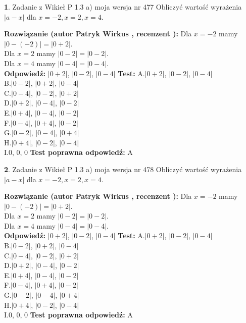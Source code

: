 \documentclass[12pt, a4paper]{article}
\theoremstyle{definition} %
\newtheorem{zad}{}
\newcommand{\zadStart}[1]{\begin{zad}#1\newline}
\newcommand{\zadStop}{\end{zad}}
\newcommand{\rozwStart}[2]{\noindent \textbf{Rozwiązanie (autor #1 , recenzent #2): }\newline}
\newcommand{\rozwStop}{\newline}
\newcommand{\odpStart}{\noindent \textbf{Odpowiedź:}\newline}
\newcommand{\odpStop}{\newline}
\newcommand{\testStart}{\noindent \textbf{Test:}\newline}
\newcommand{\testStop}{\newline}
\newcommand{\kluczStart}{\noindent \textbf{Test poprawna odpowiedź:}\newline}
\newcommand{\kluczStop}{\newline}
\begin{document}
\zadStart{Zadanie z Wikieł P 1.3 a) moja wersja nr 477}
Obliczyć wartość wyrażenia $|a - x|$ dla $x=-2,x=2,x=4$.
\zadStop
\rozwStart{Patryk Wirkus}{}
Dla $x = -2$ mamy $|0 - (-2)| = |0 + 2|$.\\
Dla $x = 2$ mamy $|0 - 2| = |0 - 2|$.\\
Dla $x = 4$ mamy $|0 - 4| = |0 - 4|$.\\
\rozwStop
\odpStart
$|0 + 2|$, $|0 - 2|$, $|0 - 4|$
\odpStop
\testStart
A.$|0 + 2|$, $|0 - 2|$, $|0 - 4|$\\
B.$|0 - 2|$, $|0 + 2|$, $|0 - 4|$\\
C.$|0 - 4|$, $|0 - 2|$, $|0 + 2|$\\
D.$|0 + 2|$, $|0 - 4|$, $|0 - 2|$\\
E.$|0 + 4|$, $|0 - 4|$, $|0 - 2|$\\
F.$|0 - 4|$, $|0 + 4|$, $|0 - 2|$\\
G.$|0 - 2|$, $|0 - 4|$, $|0 + 4|$\\
H.$|0 + 4|$, $|0 - 2|$, $|0 - 4|$\\
I.$0$, $0$, $0$
\testStop
\kluczStart
A
\kluczStop



\zadStart{Zadanie z Wikieł P 1.3 a) moja wersja nr 478}
Obliczyć wartość wyrażenia $|a - x|$ dla $x=-2,x=2,x=4$.
\zadStop
\rozwStart{Patryk Wirkus}{}
Dla $x = -2$ mamy $|0 - (-2)| = |0 + 2|$.\\
Dla $x = 2$ mamy $|0 - 2| = |0 - 2|$.\\
Dla $x = 4$ mamy $|0 - 4| = |0 - 4|$.\\
\rozwStop
\odpStart
$|0 + 2|$, $|0 - 2|$, $|0 - 4|$
\odpStop
\testStart
A.$|0 + 2|$, $|0 - 2|$, $|0 - 4|$\\
B.$|0 - 2|$, $|0 + 2|$, $|0 - 4|$\\
C.$|0 - 4|$, $|0 - 2|$, $|0 + 2|$\\
D.$|0 + 2|$, $|0 - 4|$, $|0 - 2|$\\
E.$|0 + 4|$, $|0 - 4|$, $|0 - 2|$\\
F.$|0 - 4|$, $|0 + 4|$, $|0 - 2|$\\
G.$|0 - 2|$, $|0 - 4|$, $|0 + 4|$\\
H.$|0 + 4|$, $|0 - 2|$, $|0 - 4|$\\
I.$0$, $0$, $0$
\testStop
\kluczStart
A
\kluczStop
\end{document}
